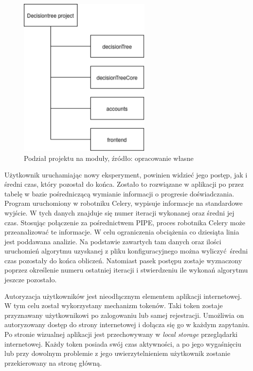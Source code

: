 \begin{figure}[htb]
	\centering
	\includegraphics[height=8cm]{grafika/packages.eps}
	\caption{Podział projektu na moduły, źródło: opracowanie własne}
	\label{rys4_packages}
\end{figure}
Użytkownik uruchamiając nowy eksperyment, powinien widzieć jego postęp, jak i średni czas, który pozostał do końca. Zostało to rozwiązane w aplikacji po przez tabelę w bazie pośredniczącą wymianie informacji o progresie doświadczania. Program uruchomiony w robotniku Celery, wypisuje informacje na standardowe wyjście. W tych danych znajduje się numer iteracji wykonanej oraz średni jej czas. Stosując połączenie za pośrednictwem PIPE, proces robotnika Celery może przeanalizować te informacje. W celu ograniczenia obciążenia co dziesiąta linia jest poddawana analizie. Na podstawie zawartych tam danych oraz ilości uruchomień algorytmu uzyskanej z pliku konfiguracyjnego można wyliczyć średni czas pozostały do końca obliczeń. Natomiast pasek postępu zostaje wyznaczony poprzez określenie numeru ostatniej iteracji i stwierdzeniu ile wykonań algorytmu jeszcze pozostało. 

Autoryzacja użytkowników jest nieodłącznym elementem aplikacji internetowej. W tym celu został wykorzystany mechanizm tokenów. Taki token zostaje przyznawany użytkownikowi po zalogowaniu lub samej rejestracji. Umożliwia on autoryzowany dostęp do strony internetowej i dołącza się go w każdym zapytaniu. Po stronie wizualnej aplikacji jest przechowywany w \textit{local storage} przeglądarki internetowej. Każdy token posiada swój czas aktywności, a po jego wygaśnięciu lub przy dowolnym problemie z jego uwierzytelnieniem użytkownik zostanie przekierowany na stronę główną. 


